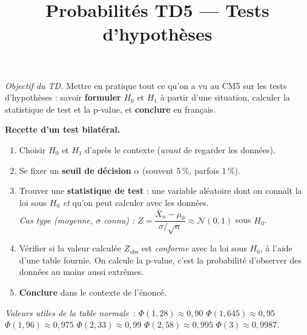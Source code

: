 

\title{Probabilités TD5 --- Tests d'hypothèses}
\author{}
\date{}

\newcommand{\R}{\mathbb{R}}
\newcommand{\E}{\mathbb{E}}
\newcommand{\Var}{\operatorname{Var}}
\newcommand{\Xbar}{\overline{X}_n}


\sffamily
\maketitle

\noindent\textit{Objectif du TD.} Mettre en pratique tout ce qu'on a vu au CM5 sur les tests d'hypothèses : savoir \textbf{formuler} $H_0$ et $H_1$ à partir d'une situation, calculer la statistique de test et la p-value, et \textbf{conclure} en français.

\medskip

\begin{mdframed}[backgroundcolor=ThemeLight, linecolor=Theme,
  linewidth=1pt, innertopmargin=8pt, innerbottommargin=8pt]
\textbf{Recette d'un test bilatéral.}
\begin{enumerate}\setlength{\itemsep}{0.2em}\setlength{\topsep}{0.1em}
  \item Choisir $H_0$ et $H_1$ d'après le contexte (\emph{avant} de regarder les données).
  \item Se fixer un \textbf{seuil de décision} $\alpha$ (souvent $5\,\%$, parfois $1\, \%$).
  \item Trouver une \textbf{statistique de test} : une variable aléatoire dont on connaît la loi sous $H_0$ \emph{et} qu'on peut calculer avec les données.\\
  \emph{Cas type (moyenne, $\sigma$ connu) :} $Z = \dfrac{\Xbar - \mu_0}{\sigma/\sqrt{n}} \approx \mathcal{N}(0,1)$ sous $H_0$.
  \item Vérifier si la valeur calculée $Z_{\text{obs}}$ est \emph{conforme} avec la loi sous $H_0$, à l'aide d'une table fournie. On calcule la p-value, c'est la probabilité d'observer des données au moins aussi extrêmes. 
  \item \textbf{Conclure} dans le contexte de l'énoncé.
\end{enumerate}
\end{mdframed}

\medskip

\textit{Valeurs utiles de la table normale}~: $\Phi(1{,}28) \approx 0{,}90$ \quad $\Phi(1{,}645) \approx 0{,}95$ \quad $\Phi(1{,}96) \approx 0{,}975$ \quad $\Phi(2{,}33) \approx 0{,}99$ \quad $\Phi(2{,}58) \approx 0{,}995$ \quad $\Phi(3) \approx 0{,}9987$.


